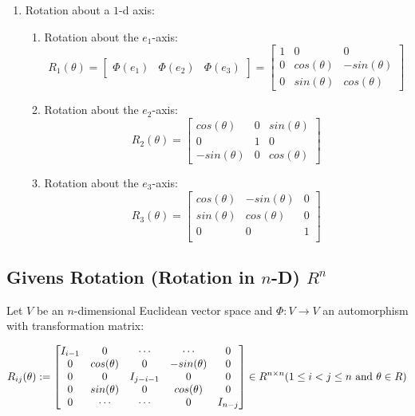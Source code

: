 \begin{enumerate}
    \item Rotation about a $1$-d axis:
    \begin{enumerate}
        \item Rotation about the $e_1$-axis:
        \[
            R_1(\theta) =
            \begin{bmatrix}
                \Phi(e_1) & \Phi(e_2) & \Phi(e_3)
            \end{bmatrix} =
            \begin{bmatrix}
                1 & 0 & 0\\
                0 & cos(\theta) & -sin(\theta) \\
                0 & sin(\theta) & cos(\theta)
            \end{bmatrix}
        \]

        \item Rotation about the $e_2$-axis:
        \[
            R_2(\theta) =
            \begin{bmatrix}
                cos(\theta) & 0 & sin(\theta) \\
                0 & 1 & 0\\
                -sin(\theta) & 0 & cos(\theta)
            \end{bmatrix}
        \]

        \item Rotation about the $e_3$-axis:
        \[
            R_3(\theta) =
            \begin{bmatrix}
                cos(\theta) & -sin(\theta) & 0 \\
                sin(\theta) & cos(\theta) & 0 \\
                0 & 0 & 1 \\
            \end{bmatrix}
        \]
    \end{enumerate}

\end{enumerate}


\subsection{Givens Rotation (Rotation in $n$-D) $R^n$}\label{Givens Rotation (Rotation in n-D)}

Let $V$ be an $n$-dimensional Euclidean vector space and $\Phi : V \to V$ an automorphism with transformation matrix:

\[
    R_{ij}(\theta) :=
    \begin{bmatrix}
        I_{i-1} & 0 & \cdots & \cdots & 0\\
        0 & cos(\theta) & 0 & -sin(\theta) & 0 \\
        0 & 0 & I_{j-i-1} & 0 & 0 \\
        0 & sin(\theta) & 0 & cos(\theta) & 0 \\
        0 & \cdots & \cdots & 0 & I_{n-j} \\
    \end{bmatrix} \in R^{n\times n}
    \hfill
    (1 \leq i < j \leq n \text{ and } \theta  \in R)
\]


